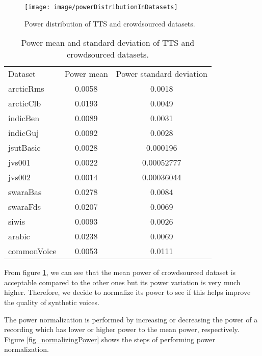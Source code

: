 \documentclass[12pt]{article}
\begin{document}
\begin{figure}[t]
\begin{center}
\texttt{[image: image/powerDistributionInDatasets]}
\end{center}
\vspace{-0.3cm}
\caption[Power distribution in TTS and crowdsourced datasets.]{Power distribution of TTS and crowdsourced datasets.}
\label{fig_powerDistribution}
\end{figure}

\begin{table}[]
\begin{center}
\caption{Power mean and standard deviation of TTS and crowdsourced datasets.}
\label{tab_powerDistribution}
\vspace{3mm}
\begin{tabular}{lcc}
\hline
Dataset & Power mean & Power standard deviation \\
\cmidrule(l{0pt}r{2pt}){1-1}\cmidrule(l{0pt}r{2pt}){2-2}\cmidrule(l{0pt}r{2pt}){3-3}
arcticRms   & 0.0058 & 0.0018 \\
arcticClb   & 0.0193 & 0.0049 \\
indicBen    & 0.0089 & 0.0031 \\
indicGuj    & 0.0092 & 0.0028 \\
jsutBasic   & 0.0028 & 0.000196 \\
jvs001      & 0.0022 & 0.00052777 \\
jvs002      & 0.0014 & 0.00036044 \\
swaraBas    & 0.0278 & 0.0084 \\
swaraFds    & 0.0207 & 0.0069 \\
siwis       & 0.0093 & 0.0026 \\
arabic      & 0.0238 & 0.0069 \\
commonVoice & 0.0053 & 0.0111 \\
\hline
\end{tabular}
\end{center}
\end{table}

From figure \ref{fig_powerDistribution}, we can see that the mean power of crowdsourced dataset is acceptable compared to the other ones but its power variation is very much higher. Therefore, we decide to normalize its power to see if this helps improve the quality of synthetic voices.

The power normalization is performed by increasing or decreasing the power of a recording which has lower or higher power to the mean power, respectively. Figure \ref{fig_normalizingPower} shows the steps of performing power normalization.
\end{document}
